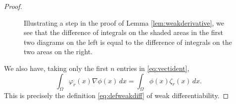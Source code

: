 \documentclass[10pt,a4paper]{amsart}
\begin{document}
\begin{proof}
%
%
%
%
%
%
%
%
%
%
%
%
%
%
%
%
%
%
%
%
%
%
%
%
%
%
%
%
%
%
%
%
%
%
%
%
%
%
%
%
  
    \begin{figure}
 
 \centering
 \caption{Illustrating a step in the proof of Lemma \ref{lem:weakderivative}, we see that the difference of integrals on the shaded areas in the first two diagrams on the left is equal to the difference of integrals on the two  areas on the right. %
 }
  \label{fig:4}
 \end{figure}
  
  We also have, taking only the first $n$ entries in \eqref{eq:vectident},
  \[\int_\Omega\varphi_r(x)\nabla\phi(x)\,dx=\int_\Omega\phi(x)\zeta_r(x)\,dx.\]
  This is precisely the definition \eqref{eq:defweakdiff} of weak differentiability.
%
\end{proof}
\end{document}
